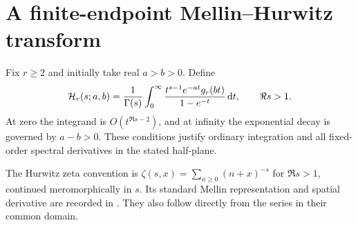 \section{A finite-endpoint Mellin--Hurwitz transform}
\label{ag:sec:hurwitz}

Fix $r\ge2$ and initially take real $a>b>0$. Define
\begin{equation}\label{ag:eq:Hmellin}
 \mathcal H_r(s;a,b)=\frac1{\Gamma(s)}\int_0^\infty
       \frac{t^{s-1}e^{-at}g_r(bt)}{1-e^{-t}}\,\mathrm d t,
                  \qquad \Re s>1.
\end{equation}
At zero the integrand is $O(t^{\Re s-2})$, and at infinity the
exponential decay is governed by $a-b>0$. These conditions justify
ordinary integration and all fixed-order spectral derivatives in the
stated half-plane.

The Hurwitz zeta convention is
$\zeta(s,x)=\sum_{n\ge0}(n+x)^{-s}$ for $\Re s>1$, continued
meromorphically in $s$. Its standard Mellin representation and spatial
derivative are recorded in \cite{DLMFzeta}. They also follow directly
from the series in their common domain.


